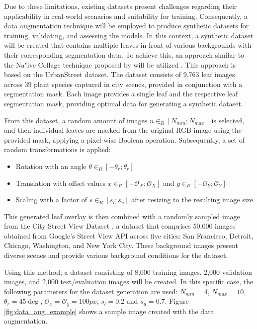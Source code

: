 \documentclass[draft,final]{vutinfth} %
\begin{document}
Due to these limitations, existing datasets present challenges regarding their applicability in real-world scenarios and suitability for training. Consequently, a data augmentation technique will be employed to produce synthetic datasets for training, validating, and assessing the models.
In this context, a synthetic dataset will be created that contains multiple leaves in front of various backgrounds with their corresponding segmentation data. To achieve this, an approach similar to the Na"ive Collage technique proposed by \citeauthor{kuznichov_data_2019} will be utilized \cite{kuznichov_data_2019}.
This approach is based on the UrbanStreet \cite{yang_urban_2023} dataset. The dataset consists of 9,763 leaf images across 39 plant species captured in city scenes, provided in conjunction with a segmentation mask. Each image provides a single leaf and the respective leaf segmentation mask, providing optimal data for generating a synthetic dataset.

From this dataset, a random amount of images $n \in_R [N_{min};N_{max}]$ is selected, and then individual leaves are masked from the original RGB image using the provided mask, applying a pixel-wise Boolean operation. Subsequently, a set of random transformations is applied:
\begin{itemize}
    \item Rotation with an angle $\theta \in_R [-\theta_r; \theta_r]$
    \item Translation with offset values $x \in_R [-\mathcal{O}_X; \mathcal{O}_X]$ and $y \in_R [-\mathcal{O}_Y; \mathcal{O}_Y]$
    \item Scaling with a factor of $s \in_R [s_l; s_u]$ after resizing to the resulting image size
\end{itemize}

This generated leaf overlay is then combined with a randomly sampled image from the City Street View Dataset \cite{stealth_username_city_2022}, a dataset that comprises 50,000 images obtained from Google's Street View API across five cities: San Francisco, Detroit, Chicago, Washington, and New York City. These background images present diverse scenes and provide various background conditions for the dataset.

Using this method, a dataset consisting of 8,000 training images, 2,000 validation images, and 2,000 test/evaluation images will be created.
In this specific case, the following parameters for the dataset generation are used: $N_{min} = 4$, $N_{max} = 10$, $\theta_r = 45\deg$, $\mathcal{O}_x = \mathcal{O}_y = 100px$, $s_l = 0.2$ and $s_u = 0.7$.
Figure \ref{fig:data_aug_example} shows a sample image created with the data augmentation.
\end{document}
